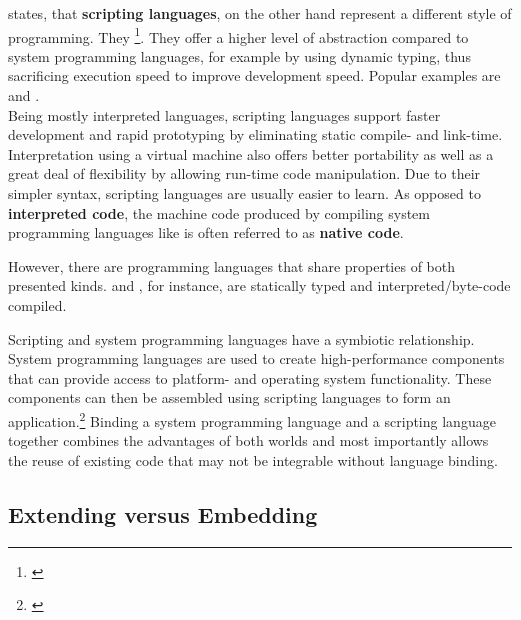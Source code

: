  states, that \textbf{scripting languages}, on the other hand represent a different style of programming. They \footnote{\citep{Ousterhout}}. They offer a higher level of abstraction compared to system programming languages, for example by using dynamic typing, thus sacrificing execution speed to improve development speed. Popular examples are  and .
\\ Being mostly interpreted languages, scripting languages support faster development and rapid prototyping by eliminating static compile- and link-time. Interpretation using a virtual machine also offers better portability as well as a great deal of flexibility by allowing run-time code manipulation. Due to their simpler syntax, scripting languages are usually easier to learn. 
As opposed to \textbf{interpreted code}, the machine code produced by compiling system programming languages like  is often referred to as \textbf{native code}.

However, there are programming languages that share properties of both presented kinds.  and , for instance, are statically typed and interpreted/byte-code compiled.

Scripting and system programming languages have a symbiotic relationship. System programming languages are used to create high-performance components that can provide access to platform- and operating system functionality. These components can then be assembled using scripting languages to form an application.\footnote{\citep{Ousterhout}} Binding a system programming language and a scripting language together combines the advantages of both worlds and most importantly allows the reuse of existing code that may not be integrable without language binding.

\subsection{Extending versus Embedding}

